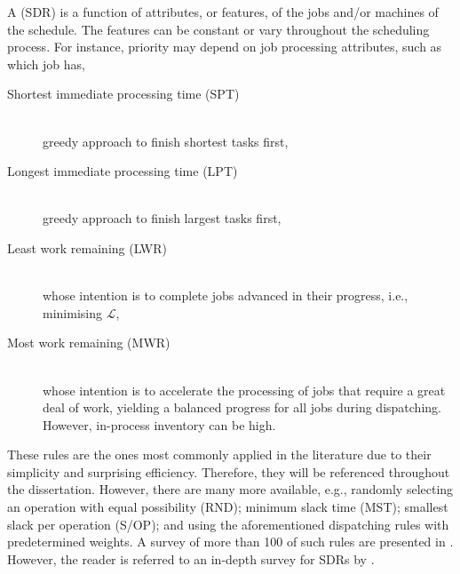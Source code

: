 A \emph{\sdr} (SDR) is a function of attributes, or features, of the jobs 
and/or machines of the schedule. The features can be constant or vary 
throughout the scheduling process. 
For instance, priority may depend on job processing attributes, such as 
which job has, 
\begin{description}
  \item[Shortest immediate processing time (SPT)] \hfill \\
  greedy approach to finish shortest tasks first,  
  \item[Longest immediate processing time (LPT)] \hfill \\
  greedy approach to finish largest tasks first, 
  \item[Least work remaining (LWR)] \hfill \\
  whose intention is to complete jobs advanced in their pro\-gress, i.e., 
  minimising $\mathcal{L}$,
  \item[Most work remaining (MWR)] \hfill \\
  whose intention is to accelerate the processing of jobs that require a 
  great deal of work, yielding a balanced progress for all jobs during 
  dispatching. However, in-process inventory can be high.
\end{description}
These rules are the ones most commonly applied in the literature due to their 
simplicity and surprising efficiency. %
Therefore, they will be referenced throughout the dissertation. 
However, there are many more available, e.g., randomly selecting an operation 
with equal possibility (RND); minimum slack time (MST); smallest slack per 
operation (S/OP); and using the aforementioned dispatching rules with 
predetermined weights. 
A survey of more than 100 of such rules are presented in \citet{Panwalkar77}. 
However, the reader is referred to an in-depth survey for SDRs by 
\citet{Haupt89}. 



